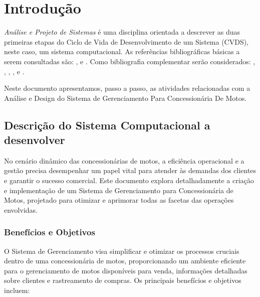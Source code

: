 

\chapter{ Introdu\c{c}\~{a}o}

\textit{An\'{a}lise e Projeto de Sistemas} \'{e} uma disciplina orientada a descrever as duas primeiras etapas do Ciclo de Vida de Desenvolvimento de um Sistema (CVDS), neste caso, um sistema computacional.  As refer\^{e}ncias bibliogr\'{a}ficas b\'{a}sicas a serem consultadas s\~{a}o: \cite{Dennis2014}, \cite{Dennis2019} \cite{Gane1983} e \cite{Sommerville2011}. Como bibliografia complementar ser\~{a}o considerados: \cite{Satzinger2012}, \cite{Shelly2012}, \cite{Valacich2020}, \cite{Kendall2020}, \cite{Budgen2021} e \cite{Engholm2013}.

Neste documento apresentamos, passo a passo,  as atividades relacionadas com a An\'{a}lise e Design do Sistema de Gerenciamento Para Concessionária De Motos.


 \section{Descri\c{c}\~{a}o do Sistema Computacional a desenvolver}

No cenário dinâmico das concessionárias de motos, a eficiência operacional e a gestão precisa desempenhar um papel vital para atender às demandas dos clientes e garantir o sucesso comercial. Este documento explora detalhadamente a criação e implementação de um Sistema de Gerenciamento para Concessionária de Motos, projetado para otimizar e aprimorar todas as facetas das operações envolvidas.

        \subsection{Benefícios e Objetivos} 
		O Sistema de Gerenciamento visa simplificar e otimizar os processos cruciais dentro de uma concessionária de motos, proporcionando um ambiente eficiente para o gerenciamento de motos disponíveis para venda, informações detalhadas sobre clientes e rastreamento de compras. Os principais benefícios e objetivos incluem:
		

